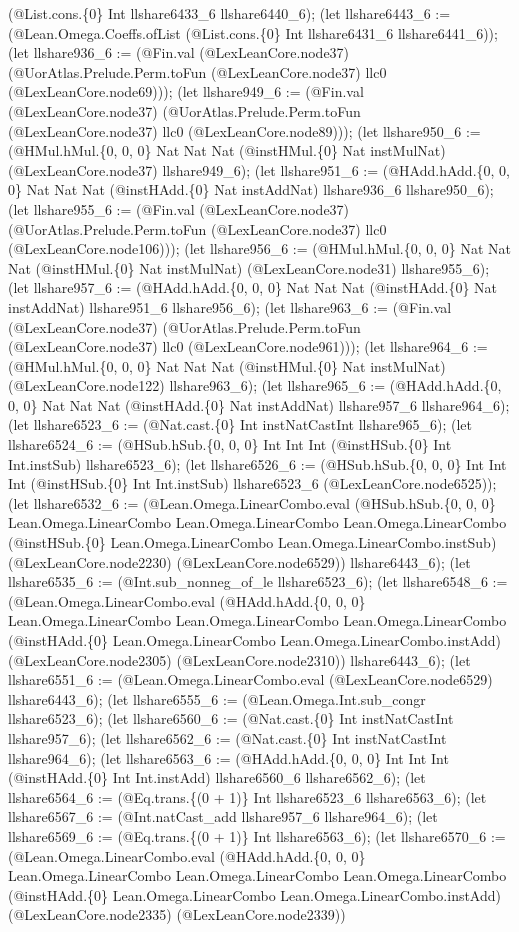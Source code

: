 \documentclass[11pt]{article}
\begin{document}
(@List.cons.\{0\} Int llshare6433\_6 llshare6440\_6); (let llshare6443\_6 := (@Lean.Omega.Coeffs.ofList (@List.cons.\{0\} Int llshare6431\_6 llshare6441\_6)); (let llshare936\_6 := (@Fin.val (@LexLeanCore.node37) (@UorAtlas.Prelude.Perm.toFun (@LexLeanCore.node37) llc0 (@LexLeanCore.node69))); (let llshare949\_6 := (@Fin.val (@LexLeanCore.node37) (@UorAtlas.Prelude.Perm.toFun (@LexLeanCore.node37) llc0 (@LexLeanCore.node89))); (let llshare950\_6 := (@HMul.hMul.\{0, 0, 0\} Nat Nat Nat (@instHMul.\{0\} Nat instMulNat) (@LexLeanCore.node37) llshare949\_6); (let llshare951\_6 := (@HAdd.hAdd.\{0, 0, 0\} Nat Nat Nat (@instHAdd.\{0\} Nat instAddNat) llshare936\_6 llshare950\_6); (let llshare955\_6 := (@Fin.val (@LexLeanCore.node37) (@UorAtlas.Prelude.Perm.toFun (@LexLeanCore.node37) llc0 (@LexLeanCore.node106))); (let llshare956\_6 := (@HMul.hMul.\{0, 0, 0\} Nat Nat Nat (@instHMul.\{0\} Nat instMulNat) (@LexLeanCore.node31) llshare955\_6); (let llshare957\_6 := (@HAdd.hAdd.\{0, 0, 0\} Nat Nat Nat (@instHAdd.\{0\} Nat instAddNat) llshare951\_6 llshare956\_6); (let llshare963\_6 := (@Fin.val (@LexLeanCore.node37) (@UorAtlas.Prelude.Perm.toFun (@LexLeanCore.node37) llc0 (@LexLeanCore.node961))); (let llshare964\_6 := (@HMul.hMul.\{0, 0, 0\} Nat Nat Nat (@instHMul.\{0\} Nat instMulNat) (@LexLeanCore.node122) llshare963\_6); (let llshare965\_6 := (@HAdd.hAdd.\{0, 0, 0\} Nat Nat Nat (@instHAdd.\{0\} Nat instAddNat) llshare957\_6 llshare964\_6); (let llshare6523\_6 := (@Nat.cast.\{0\} Int instNatCastInt llshare965\_6); (let llshare6524\_6 := (@HSub.hSub.\{0, 0, 0\} Int Int Int (@instHSub.\{0\} Int Int.instSub) llshare6523\_6); (let llshare6526\_6 := (@HSub.hSub.\{0, 0, 0\} Int Int Int (@instHSub.\{0\} Int Int.instSub) llshare6523\_6 (@LexLeanCore.node6525)); (let llshare6532\_6 := (@Lean.Omega.LinearCombo.eval (@HSub.hSub.\{0, 0, 0\} Lean.Omega.LinearCombo Lean.Omega.LinearCombo Lean.Omega.LinearCombo (@instHSub.\{0\} Lean.Omega.LinearCombo Lean.Omega.LinearCombo.instSub) (@LexLeanCore.node2230) (@LexLeanCore.node6529)) llshare6443\_6); (let llshare6535\_6 := (@Int.sub\_nonneg\_of\_le llshare6523\_6); (let llshare6548\_6 := (@Lean.Omega.LinearCombo.eval (@HAdd.hAdd.\{0, 0, 0\} Lean.Omega.LinearCombo Lean.Omega.LinearCombo Lean.Omega.LinearCombo (@instHAdd.\{0\} Lean.Omega.LinearCombo Lean.Omega.LinearCombo.instAdd) (@LexLeanCore.node2305) (@LexLeanCore.node2310)) llshare6443\_6); (let llshare6551\_6 := (@Lean.Omega.LinearCombo.eval (@LexLeanCore.node6529) llshare6443\_6); (let llshare6555\_6 := (@Lean.Omega.Int.sub\_congr llshare6523\_6); (let llshare6560\_6 := (@Nat.cast.\{0\} Int instNatCastInt llshare957\_6); (let llshare6562\_6 := (@Nat.cast.\{0\} Int instNatCastInt llshare964\_6); (let llshare6563\_6 := (@HAdd.hAdd.\{0, 0, 0\} Int Int Int (@instHAdd.\{0\} Int Int.instAdd) llshare6560\_6 llshare6562\_6); (let llshare6564\_6 := (@Eq.trans.\{(0 + 1)\} Int llshare6523\_6 llshare6563\_6); (let llshare6567\_6 := (@Int.natCast\_add llshare957\_6 llshare964\_6); (let llshare6569\_6 := (@Eq.trans.\{(0 + 1)\} Int llshare6563\_6); (let llshare6570\_6 := (@Lean.Omega.LinearCombo.eval (@HAdd.hAdd.\{0, 0, 0\} Lean.Omega.LinearCombo Lean.Omega.LinearCombo Lean.Omega.LinearCombo (@instHAdd.\{0\} Lean.Omega.LinearCombo Lean.Omega.LinearCombo.instAdd) (@LexLeanCore.node2335) (@LexLeanCore.node2339)) 
\end{document}
